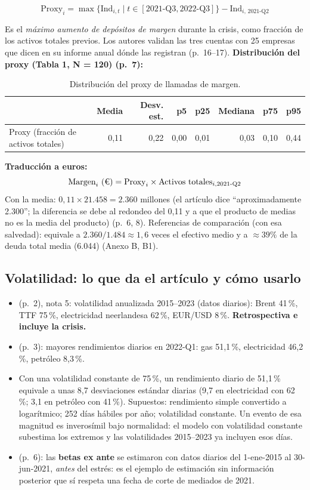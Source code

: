 \documentclass{article} %
\newcommand{\pg}[1]{(p.~#1)}
\newcommand{\eur}{\texteuro}
\begin{document}
    \[
    \text{Proxy}_i=\max\Big\{\text{Ind}_{i,t} \;\big|\; t\in[2021\text{-Q3},2022\text{-Q3}]\Big\}-\text{Ind}_{i,\,2021\text{-Q2}}
    \]

    Es el \emph{máximo aumento de depósitos de margen} durante la crisis, como fracción de los activos totales previos. Los autores validan las tres cuentas con 25 empresas que dicen en su informe anual dónde las registran \pg{16--17}.
    \newpage
    \textbf{Distribución del proxy (Tabla 1, N = 120) \pg{7}:}
    \begin{table}[H]
    \centering\small
    \begin{tabular}{lrrrrrrr}
    \toprule
    & Media & Desv. est. & p5 & p25 & Mediana & p75 & p95 \\
    \midrule
    Proxy (fracción de activos totales) & 0,11 & 0,22 & 0,00 & 0,01 & 0,03 & 0,10 & 0,44 \\
    \bottomrule
    \end{tabular}
    \caption{Distribución del proxy de llamadas de margen.}
    \end{table}

    \textbf{Traducción a euros:} 
    $$\text{Margen}_i\ (\text{\eur})=\text{Proxy}_i\times \text{Activos totales}_{i,2021\text{-Q2}}$$
    Con la media: $0{,}11\times21.458=2.360$ millones 
    (el artículo dice ``aproximadamente 2.300''; 
    la diferencia se debe al redondeo del 0,11 y a que el producto de medias no es la media del producto) 
    \pg{6, 8}. Referencias de comparación (con esa salvedad): equivale a $2.360/1.484\approx1{,}6$ veces 
    el efectivo medio y a $\approx39\%$ de la deuda total media (6.044) (Anexo B, B1).

    \subsection{Volatilidad: lo que da el artículo y cómo usarlo}

    \begin{itemize}
        \item \pg{2}, nota 5: volatilidad anualizada 2015--2023 (datos diarios): Brent 41\,\%, TTF 75\,\%, electricidad neerlandesa 62\,\%, EUR/USD 8\,\%. \textbf{Retrospectiva e incluye la crisis.}
        \item \pg{3}: mayores rendimientos diarios en 2022-Q1: gas 51,1\,\%, electricidad 46,2\,\%, petróleo 8,3\,\%.
        \item Con una volatilidad constante de 75\,\%, un rendimiento diario de 51,1\,\% equivale a unas 8,7 desviaciones estándar diarias (9,7 en electricidad con 62\,\%; 3,1 en petróleo con 41\,\%). Supuestos: rendimiento simple convertido a logarítmico; 252 días hábiles por año; volatilidad constante. Un evento de esa magnitud es inverosímil bajo normalidad: el modelo con volatilidad constante subestima los extremos y las volatilidades 2015--2023 ya incluyen esos días.
        \item \pg{6}: las \textbf{betas ex ante} se estimaron con datos diarios del 1-ene-2015 al 30-jun-2021, \emph{antes} del estrés: es el ejemplo de estimación sin información posterior que sí respeta una fecha de corte de mediados de 2021.
    \end{itemize}
\end{document}
